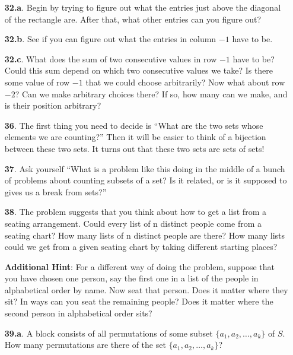 \documentclass[10pt,]{book}
\theoremstyle{plain}
\theoremstyle{definition}
\theoremstyle{definition}
\numberwithin{equation}{chapter}
\begin{document}
\begin{itemize}[itemsep=1em]
\item[\textbf{32.a}.]\hypertarget{p-175}{}%
Begin by trying to figure out what the entries just above the diagonal of the rectangle are. After that, what other entries can you figure out?%

\item[\textbf{32.b}.]\hypertarget{p-178}{}%
See if you can figure out what the entries in column \(-1\) have to be.%

\item[\textbf{32.c}.]\hypertarget{p-181}{}%
What does the sum of two consecutive values in row \(-1\) have to be? Could this sum depend on which two consecutive values we take? Is there some value of row \(-1\) that we could choose arbitrarily? Now what about row \(-2\)? Can we make arbitrary choices there? If so, how many can we make, and is their position arbitrary?%

\item[\textbf{36}.]\hypertarget{p-211}{}%
The first thing you need to decide is ``What are the two sets whose elements we are counting?'' Then it will be easier to think of a bijection between these two sets. It turns out that these two sets are sets of sets!%

\item[\textbf{37}.]\hypertarget{p-214}{}%
Ask yourself ``What is a problem like this doing in the middle of a bunch of problems about counting subsets of a set? Is it related, or is it supposed to gives us a break from sets?''%

\item[\textbf{38}.]\hypertarget{p-217}{}%
The problem suggests that you think about how to get a list from a seating arrangement. Could every list of n distinct people come from a seating chart? How many lists of n distinct people are there? How many lists could we get from a given seating chart by taking different starting places?%

\par\smallskip
\noindent\textbf{Additional Hint}: \hypertarget{p-218}{}%
For a different way of doing the problem, suppose that you have chosen one person, say the first one in a list of the people in alphabetical order by name. Now seat that person. Does it matter where they sit? In ways can you seat the remaining people? Does it matter where the second person in alphabetical order sits?%

\item[\textbf{39.a}.]\hypertarget{p-224}{}%
A block consists of all permutations of some subset \(\{a_1 , a_2, \ldots, a_k \}\) of \(S\). How many permutations are there of the set \(\{a_1 , a_2, \ldots, a_k \}\)?%


\end{itemize}
\end{document}
